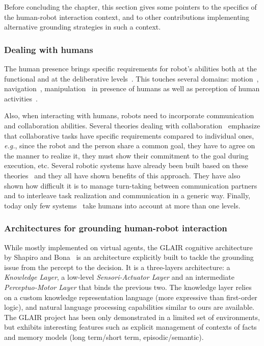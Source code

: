 \documentclass{svmult}
\begin{document}
Before concluding the chapter, this section gives some pointers to the specifics of the human-robot interaction context, 
and to other contributions implementing alternative grounding strategies in such a context.

\subsubsection{Dealing with humans}

The human presence brings specific requirements for robot's abilities both at
the functional and at the deliberative levels~\cite{Klein2004}. This touches
several domains: motion~\cite{Kulic2007,Berg2004},
navigation~\cite{Althaus2004,Sisbot2007}, manipulation~\cite{Kemp2007} in
presence of humans as well as perception of human
activities~\cite{Breazeal2001,Burger2008}.

Also, when interacting with humans, robots need to incorporate communication
and collaboration abilities. Several theories dealing with
collaboration~\cite{Cohen1991,Grosz1996,Clark1996} emphasize that collaborative
tasks have specific requirements compared to individual ones, {\it e.g.}, since the
robot and the person share a common goal, they have to agree on the manner to
realize it, they must show their commitment to the goal during execution, etc.
Several robotic systems have already been built based on these
theories~\cite{Rich1997,Sidner2005,Tambe1997,Breazeal2003} and they all have
shown benefits of this approach. They have also shown how difficult it is to
manage turn-taking between communication partners and to interleave task
realization and communication in a generic way. Finally, today only few
systems~\cite{Fong2006,Breazeal2003,Sisbot2008, Pandey2011} take humans into
account at more than one levels.


\subsubsection{Architectures for grounding human-robot interaction}

While mostly implemented on virtual agents, the GLAIR cognitive architecture by
Shapiro and Bona~\cite{Shapiro2009} is an architecture explicitly built to
tackle the grounding issue from the percept to the decision. It is a
three-layers architecture: a \emph{Knowledge Layer}, a low-level
\emph{Sensori-Actuator Layer} and an intermediate \emph{Perceptuo-Motor Layer}
that binds the previous two.  The knowledge layer relies on a custom knowledge
representation language (more expressive than first-order logic), and natural
language processing capabilities similar to ours are available. The GLAIR
project has been only demonstrated in a limited set of environments, but
exhibits interesting features such as explicit management of contexts of facts
and memory models (long term/short term, episodic/semantic).
\end{document}
